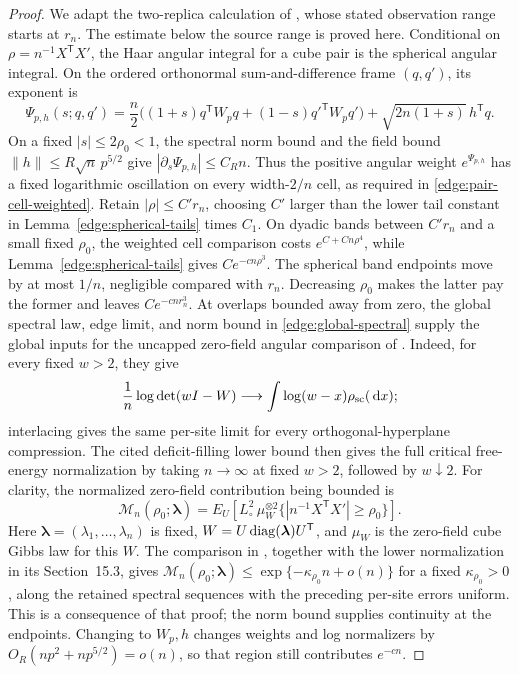 \begin{proof}
We adapt the two-replica calculation of
\cite[Lemma~3.2, Equations~(3.3)--(3.4)]{FUA}, whose stated observation
range starts at \(r_n\).  The estimate below the source range is proved
here.
Conditional on \(\rho=n^{-1}X^{\mathsf T}X'\), the Haar angular
integral for a cube pair is the spherical angular integral.  On the
ordered orthonormal sum-and-difference frame \((q,q')\), its exponent is
\begin{equation}\label{edge:pair-angular-exponent}
 \Psi_{p,h}(s;q,q')=
 \frac n2\bigl((1+s)q^{\mathsf T}W_pq
       +(1-s){q'}^{\mathsf T}W_pq'\bigr)
       +\sqrt{2n(1+s)}\,h^{\mathsf T}q.
\end{equation}
On a fixed \(|s|\le2\rho_0<1\), the spectral norm bound and the field
bound \(\|h\|\le R\sqrt n\,p^{5/2}\) give
\(|\partial_s\Psi_{p,h}|\le C_Rn\).  Thus the positive angular weight
\(e^{\Psi_{p,h}}\) has a fixed logarithmic oscillation on every
width-\(2/n\) cell, as required in \eqref{edge:pair-cell-weighted}.
Retain
\(|\rho|\le C'r_n\), choosing \(C'\) larger than the lower tail
constant in Lemma~\ref{edge:spherical-tails} times \(C_1\).
On dyadic bands between \(C'r_n\) and a small fixed \(\rho_0\),
the weighted cell comparison costs \(e^{C+Cn\rho^4}\), while
Lemma~\ref{edge:spherical-tails} gives \(Ce^{-cn\rho^3}\).
The spherical band endpoints move by at most \(1/n\), negligible
compared with \(r_n\).
Decreasing \(\rho_0\) makes the latter pay the former and leaves
\(Ce^{-cnr_n^3}\).  At overlaps bounded away from zero, the global
spectral law, edge limit, and norm bound in \eqref{edge:global-spectral}
supply the global inputs for the uncapped zero-field angular comparison
of \cite[Section~15.4]{CM}.  Indeed, for every fixed \(w>2\), they give
\[
 \frac1n\log\det(wI-W)\longrightarrow
       \int\log(w-x)\rho_{\rm sc}(\,\mathrm d x);
\]
interlacing gives the same per-site limit for every orthogonal-hyperplane
compression.  The cited deficit-filling lower bound then gives the full
critical free-energy normalization by taking \(n\to\infty\) at fixed
\(w>2\), followed by \(w\downarrow2\).  For clarity, the normalized
zero-field contribution being bounded is
\[
 \mathcal M_n(\rho_0;\boldsymbol\lambda)
   =E_U\!\left[L_\circ^2\,
       \mu_W^{\otimes2}\{|n^{-1}X^{\mathsf T}X'|\ge\rho_0\}\right].
\]
Here \(\boldsymbol\lambda=(\lambda_1,\ldots,\lambda_n)\) is fixed,
\(W=U\operatorname{diag}(\boldsymbol\lambda)U^{\mathsf T}\), and \(\mu_W\) is the
zero-field cube Gibbs law for this \(W\).
The comparison in
\cite[Section~15.4, ``Zero field and overlaps bounded away from zero'']{CM},
together with the lower normalization in its Section~15.3, gives
\(\mathcal M_n(\rho_0;\boldsymbol\lambda)\le
\exp\{-\kappa_{\rho_0}n+o(n)\}\) for a fixed \(\kappa_{\rho_0}>0\),
along the retained spectral sequences with the preceding per-site
errors uniform.  This is a consequence of that proof; the norm bound
supplies continuity at the endpoints.
Changing to \(W_p,h\) changes weights and log normalizers by
\(O_R(np^2+np^{5/2})=o(n)\), so that region still contributes \(e^{-cn}\).


\end{proof}
